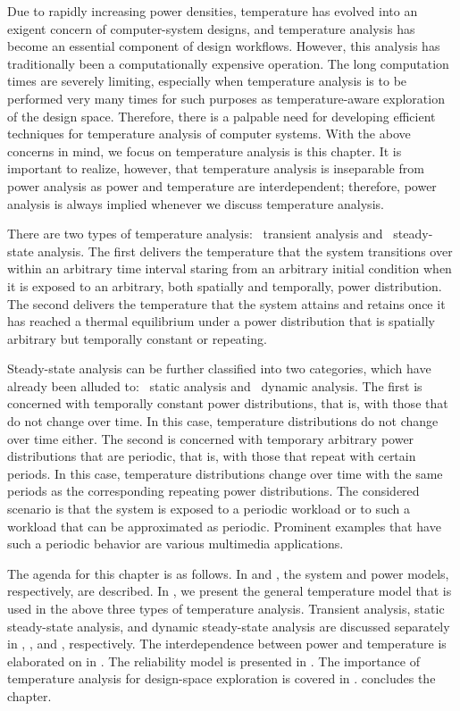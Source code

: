 Due to rapidly increasing power densities, temperature has evolved into an
exigent concern of computer-system designs, and temperature analysis has become
an essential component of design workflows. However, this analysis has
traditionally been a computationally expensive operation. The long computation
times are severely limiting, especially when temperature analysis is to be
performed very many times for such purposes as temperature-aware exploration of
the design space. Therefore, there is a palpable need for developing efficient
techniques for temperature analysis of computer systems. With the above concerns
in mind, we focus on temperature analysis is this chapter. It is important to
realize, however, that temperature analysis is inseparable from power analysis
as power and temperature are interdependent; therefore, power analysis is always
implied whenever we discuss temperature analysis.

There are two types of temperature analysis: \one~transient analysis and
\two~steady-state analysis. The first delivers the temperature that the system
transitions over within an arbitrary time interval staring from an arbitrary
initial condition when it is exposed to an arbitrary, both spatially and
temporally, power distribution. The second delivers the temperature that the
system attains and retains once it has reached a thermal equilibrium under a
power distribution that is spatially arbitrary but temporally constant or
repeating.

Steady-state analysis can be further classified into two categories, which have
already been alluded to: \one~static analysis and \two~dynamic analysis. The
first is concerned with temporally constant power distributions, that is, with
those that do not change over time. In this case, temperature distributions do
not change over time either. The second is concerned with temporary arbitrary
power distributions that are periodic, that is, with those that repeat with
certain periods. In this case, temperature distributions change over time with
the same periods as the corresponding repeating power distributions. The
considered scenario is that the system is exposed to a periodic workload or to
such a workload that can be approximated as periodic. Prominent examples that
have such a periodic behavior are various multimedia applications.

The agenda for this chapter is as follows. In  and
, the system and power models, respectively, are described. In
, we present the general temperature model that is used
in the above three types of temperature analysis. Transient analysis, static
steady-state analysis, and dynamic steady-state analysis are discussed
separately in , , and
, respectively. The interdependence between power and
temperature is elaborated on in . The
reliability model is presented in . The importance of
temperature analysis for design-space exploration is covered in
.  concludes the
chapter.
